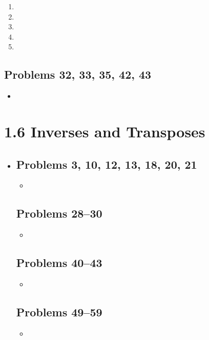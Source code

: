 \begin{itemize}
\begin{enumerate}
      \item

      \item

      \item

      \item

      \item

    \end{enumerate}

    \subsection{Problems 32, 33, 35, 42, 43}
    \begin{itemize}
      \item
    \end{itemize}

\end{itemize}

\section{1.6 Inverses and Transposes}
\begin{itemize}
  \item []

    \subsection{Problems 3, 10, 12, 13, 18, 20, 21}
    \begin{itemize}
      \item
    \end{itemize}

    \subsection{Problems 28--30}
    \begin{itemize}
      \item
    \end{itemize}

    \subsection{Problems 40--43}
    \begin{itemize}
      \item
    \end{itemize}

    \subsection{Problems 49--59}
    \begin{itemize}
      \item
    \end{itemize}

\end{itemize}


